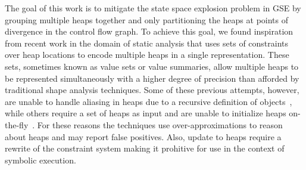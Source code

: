 
The goal of this work is to mitigate the state space explosion problem
in GSE by grouping multiple heaps together and only partitioning the
heaps at points of divergence in the control flow graph. To achieve
this goal, we found inspiration from recent work in the domain of
static analysis that uses sets of constraints over heap locations to
encode multiple heaps in a single representation. These sets,
sometimes known as value sets or value summaries, allow multiple heaps
to be represented simultaneously with a higher degree of precision
than afforded by traditional shape analysis techniques. Some of these
previous attempts, however, are unable to handle aliasing in heaps due
to a recursive definition of objects~\cite{..}, while others require a
set of heaps as input and are unable to initialize heaps
on-the-fly~\cite{..}. For these reasons the techniques use
over-approximations to reason about heaps and may report false
positives. Also, update to heaps require a rewrite of the constraint
system making it prohitive for use in the context of symbolic
execution.






